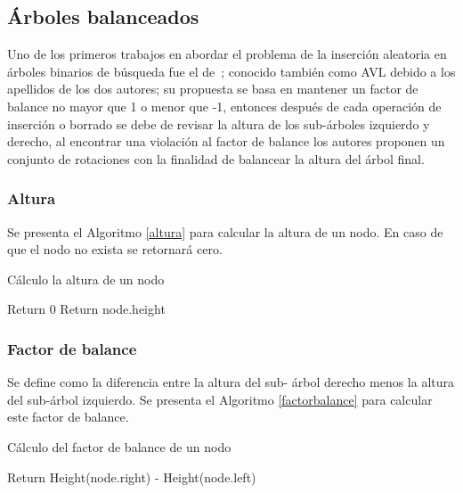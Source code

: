 \documentclass[paper=a4, fontsize=11pt]{scrartcl} %
\numberwithin{equation}{section} %
\numberwithin{figure}{section} %
\numberwithin{table}{section} %
\begin{document}
\subsection{Árboles balanceados}
Uno de los primeros trabajos en abordar el problema de la inserción aleatoria en árboles binarios de búsqueda fue el de~\cite{adelson1962}; conocido también como AVL debido a los apellidos de los dos autores; su propuesta se basa en mantener un factor de balance no mayor que 1 o menor que -1, entonces después de cada operación de inserción o borrado se debe de revisar la altura de los sub-árboles izquierdo y derecho, al encontrar una violación al factor de balance los autores proponen un conjunto de rotaciones con la finalidad de balancear la altura del árbol final.
\subsubsection{Altura}
Se presenta el Algoritmo \ref{altura} para calcular la altura de un nodo. En caso de que el nodo no exista se retornará cero.

\begin{algorithm}
\caption{Cálculo la altura de un nodo}\label{altura}
\begin{algorithmic}[1]
\State Return 0
\Else 
\State Return node.height
\EndIf
\EndProcedure
\end{algorithmic}
\end{algorithm}

\subsubsection{Factor de balance}
Se define como la diferencia entre la altura del sub- árbol derecho menos la altura del sub-árbol izquierdo. Se presenta el Algoritmo \ref{factorbalance} para calcular este factor de balance.

\begin{algorithm}
\caption{Cálculo del factor de balance de un nodo}\label{factorbalance}
\begin{algorithmic}[1]
\State Return Height(node.right) - Height(node.left)
\EndProcedure
\end{algorithmic}
\end{algorithm}
\end{document}
